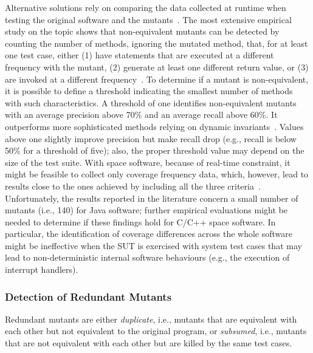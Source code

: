 Alternative solutions rely on comparing the data collected at runtime when testing the original software and the mutants~\cite{grun2009impact,schuler2010covering,schuler2013covering}.
The most extensive empirical study on the topic shows that non-equivalent mutants can be detected by counting the number of methods, ignoring the mutated method, that, for at least one test case, either (1) have statements that are executed at a different frequency with the mutant, (2) generate at least one different return value, or (3) are invoked at a different frequency~\cite{schuler2013covering}. To determine if a mutant is non-equivalent, it is possible to define a threshold indicating the smallest number of methods with such characteristics. A threshold of one identifies non-equivalent mutants with an average precision above 70\% and an average recall above 60\%. It outperforms more sophisticated methods relying on dynamic invariants~\cite{schuler2009efficient}.
Values above one slightly improve precision but make recall drop (e.g., recall is below 50\% for a threshold of five); also, the proper threshold value may depend on the size of the test suite. With space software, because of real-time constraint, it might be feasible to collect only coverage frequency data, which, however, lead to results close to the ones achieved by including all the three criteria~\cite{schuler2013covering}.
Unfortunately, the  results reported in the literature concern a small number of mutants (i.e., 140) for Java software; further empirical evaluations might be needed to determine if these findings hold for C/C++ space software. 
In particular, the identification of coverage differences across the whole software might be ineffective when the SUT is exercised with system test cases that may lead to non-deterministic internal software behaviours (e.g., the execution of interrupt handlers).

\subsubsection{Detection of Redundant Mutants}

Redundant mutants are either \emph{duplicate}, i.e., mutants that are equivalent with each other but not equivalent to the original program, or \emph{subsumed}, i.e., mutants that are not equivalent with each other but are killed by the same test cases. 

